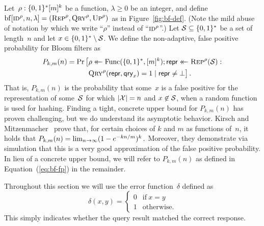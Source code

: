 Let~$\rho:\{0,1\}^*[m]^k$ be a function, $\lambda\geq0$ be an integer, and
define $\mathrm{bf}[\textnormal{\textsc{id}}^\rho,n,\lambda] = (\textnormal{\textsc{Rep}}^\rho, \textnormal{\textsc{Qry}}^\rho, \textnormal{\textsc{Up}}^\rho)$ as in
Figure~\ref{fig:bf-def}. (Note the mild abuse of notation by which we write
``$\rho$'' instead of ``$\textnormal{\textsc{id}}^\rho$''.)
%
Let $\mathcal{S}\subseteq\{0,1\}^*$ be a set of length~$n$ and let
$x\in\{0,1\}^*\setminus\mathcal{S}$. We define the non-adaptive, false positive
probability for Bloom filters as
\begin{equation}\label{eq:bf-fp}
  \begin{aligned}
    P_{k,m}(n) =
      \Pr\big[&\rho \mathrel{\leftarrow\mkern-14mu\leftarrow} \mathrm{Func}(\{0,1\}^*,[m]^k);
              \mathsf{repr} \mathrel{\leftarrow\mkern-14mu\leftarrow} \textnormal{\textsc{Rep}}^\rho(\mathcal{S}): \\
              &\textnormal{\textsc{Qry}}^\rho(\mathsf{repr}, \mathsf{qry}_x) = 1 \mid \mathsf{repr} \ne \bot
      \big] \,.
  \end{aligned}
\end{equation}
%
%
That is, $P_{k,m}(n)$ is the probability that some~$x$ is a false positive for
the representation of some~$\mathcal{S}$ for which $|\mathcal{X}|=n$ and $x\not\in\mathcal{S}$,
when a random function is used for hashing.
%
Finding a tight, concrete upper bound for $P_{k,m}(n)$ has proven challenging,
but we do understand its asymptotic behavior. Kirsch and
Mitzenmacher~\cite{kirsch2006less} prove that, for certain choices of $k$ and
$m$ as functions of~$n$, it holds that
$
  P_{k,m}(n) = \lim_{n{\rightarrow}\infty} (1-e^{-kn/m})^k \,.
$
%
Moreover, they demonstrate via simulation that this is a very good approximation
of the false positive probability.
%
In lieu of a concrete upper bound, we will refer to $P_{k,m}(n)$ as defined in
Equation~(\ref{eq:bf-fp}) in the remainder.

%
Throughout this section we will use the error function~$\delta$ defined as
\begin{equation}
  \delta(x, y) =
  \begin{cases}
    0 & \text{if}\ x=y \\
    1 & \text{otherwise.}
  \end{cases}
\end{equation}
This simply indicates whether the query result matched the correct response.

